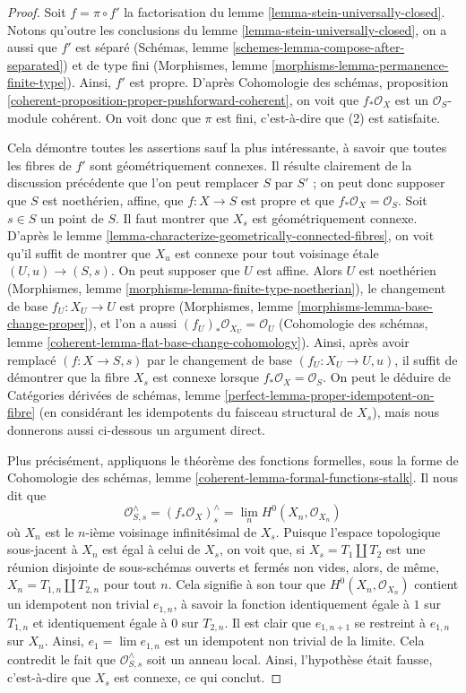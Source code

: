 \begin{proof}
Soit $f = \pi \circ f'$ la factorisation du
lemme \ref{lemma-stein-universally-closed}. Notons qu'outre les
conclusions du lemme \ref{lemma-stein-universally-closed}, on
a aussi que $f'$ est séparé
(Schémas, lemme \ref{schemes-lemma-compose-after-separated})
et de type fini
(Morphismes, lemme \ref{morphisms-lemma-permanence-finite-type}).
Ainsi, $f'$ est propre. D'après
Cohomologie des schémas, proposition
\ref{coherent-proposition-proper-pushforward-coherent},
on voit que $f_*\mathcal{O}_X$ est un $\mathcal{O}_S$-module cohérent.
On voit donc que $\pi$ est fini, c'est-à-dire que (2) est satisfaite.

\medskip\noindent
Cela démontre toutes les assertions sauf la plus intéressante, à savoir que
toutes les fibres de $f'$ sont géométriquement connexes.
Il résulte clairement de la discussion précédente que l'on peut remplacer $S$ par $S'$ ;
on peut donc supposer que $S$ est noethérien, affine,
que $f : X \to S$ est propre et que $f_*\mathcal{O}_X = \mathcal{O}_S$.
Soit $s \in S$ un point de $S$. Il faut montrer que $X_s$ est
géométriquement connexe. D'après le lemme
\ref{lemma-characterize-geometrically-connected-fibres},
on voit qu'il suffit de montrer que $X_u$ est connexe
pour tout voisinage \'etale $(U, u) \to (S, s)$.
On peut supposer que $U$ est affine. Alors $U$ est noethérien
(Morphismes, lemme \ref{morphisms-lemma-finite-type-noetherian}),
le changement de base $f_U : X_U \to U$ est propre
(Morphismes, lemme \ref{morphisms-lemma-base-change-proper}),
et l'on a aussi $(f_U)_*\mathcal{O}_{X_U} = \mathcal{O}_U$
(Cohomologie des schémas, lemme \ref{coherent-lemma-flat-base-change-cohomology}).
Ainsi, après avoir remplacé
$(f : X \to S, s)$ par le changement de base $(f_U : X_U \to U, u)$,
il suffit de démontrer que la fibre $X_s$ est connexe lorsque
$f_*\mathcal{O}_X = \mathcal{O}_S$. On peut le déduire de
Catégories dérivées de schémas, lemme
\ref{perfect-lemma-proper-idempotent-on-fibre}
(en considérant les idempotents du faisceau structural de $X_s$),
mais nous donnerons aussi ci-dessous un argument direct.

\medskip\noindent
Plus précisément, appliquons le théorème des fonctions formelles,
sous la forme de Cohomologie des schémas, lemme
\ref{coherent-lemma-formal-functions-stalk}.
Il nous dit que
$$
\mathcal{O}^\wedge_{S, s} = (f_*\mathcal{O}_X)_s^\wedge =
\lim_n H^0(X_n, \mathcal{O}_{X_n})
$$
où $X_n$ est le $n$-ième voisinage infinitésimal de $X_s$.
Puisque l'espace topologique sous-jacent à $X_n$ est égal à celui
de $X_s$, on voit que, si $X_s = T_1 \amalg T_2$ est une réunion disjointe
de sous-schémas ouverts et fermés non vides, alors, de même,
$X_n = T_{1, n} \amalg T_{2, n}$ pour tout $n$. Cela signifie à son tour que
$H^0(X_n, \mathcal{O}_{X_n})$ contient un idempotent non trivial $e_{1, n}$,
à savoir la fonction identiquement égale à $1$ sur $T_{1, n}$ et
identiquement égale à $0$ sur $T_{2, n}$. Il est clair que $e_{1, n + 1}$
se restreint à $e_{1, n}$ sur $X_n$. Ainsi, $e_1 = \lim e_{1, n}$
est un idempotent non trivial de la limite. Cela contredit le fait
que $\mathcal{O}^\wedge_{S, s}$ soit un anneau local. Ainsi,
l'hypothèse était fausse, c'est-à-dire que $X_s$ est connexe, ce qui conclut.
\end{proof}

